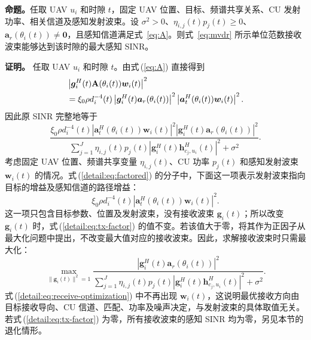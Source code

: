 \documentclass[11pt,a4paper]{ctexart}
\begin{document}
\noindent\textbf{命题。}任取 UAV $u_i$ 和时隙 $t$，固定 UAV 位置、目标、频谱共享关系、CU 发射功率、相关信道及感知发射波束。设 $\sigma^2>0$、$\eta_{i,j}(t)p_j(t)\ge0$、$\bm a_r(\theta_i(t))\ne\bm0$，且感知信道满足式~\eqref{eq:A}。则式~\eqref{eq:mvdr} 所示单位范数接收波束能够达到该时隙的最大感知 SINR。

\medskip
\noindent\textbf{证明。}
任取 UAV $u_i$ 和时隙 $t$。由式\,(\ref{eq:A}) 直接得到
\begin{align}
&\left|\bm g_i^H(t)\mathbf A(\theta_i(t))\bm w_i(t)\right|^2\notag\\
&=\xi_0\rho d_i^{-4}(t)
\left|\bm g_i^H(t)\bm a_r(\theta_i(t))\right|^2
\left|\bm a_t^H(\theta_i(t))\bm w_i(t)\right|^2.\label{detail:eq:factor}
\end{align}
因此原 SINR 完整地等于
\begin{equation}\label{detail:eq:factored}
\frac{\xi_0\rho d_i^{-4}(t)
\left|\bm a_t^H(\theta_i(t))\bm w_i(t)\right|^2
\left|\bm g_i^H(t)\bm a_r(\theta_i(t))\right|^2}
{\displaystyle\sum_{j=1}^J\eta_{i,j}(t)p_j(t)
\left|\bm g_i^H(t)\bm h_{c_j,u_i}^{H}(t)\right|^2+\sigma^2}.
\end{equation}
考虑固定 UAV 位置、频谱共享变量 $\eta_{i,j}(t)$、CU 功率 $p_j(t)$ 和感知发射波束 $\bm w_i(t)$ 的情况。式\,(\ref{detail:eq:factored}) 的分子中，下面这一项表示发射波束指向目标的增益及感知信道的路径增益：
\begin{equation}\label{detail:eq:tx-factor}
\xi_0\rho d_i^{-4}(t)
\left|\bm a_t^H(\theta_i(t))\bm w_i(t)\right|^2.
\end{equation}
这一项只包含目标参数、位置及发射波束，没有接收波束 $\bm g_i(t)$；所以改变 $\bm g_i(t)$ 时，式\,(\ref{detail:eq:tx-factor}) 的值不变。若该值大于零，将其作为正因子从最大化问题中提出，不改变最大值对应的接收波束。因此，求解接收波束时只需最大化：
\begin{equation}\label{detail:eq:receive-optimization}
\max_{\|\bm g_i(t)\|^2=1}
\frac{\left|\bm g_i^H(t)\bm a_r(\theta_i(t))\right|^2}
{\displaystyle\sum_{j=1}^J\eta_{i,j}(t)p_j(t)
\left|\bm g_i^H(t)\bm h_{c_j,u_i}^{H}(t)\right|^2+\sigma^2}.
\end{equation}
式\,(\ref{detail:eq:receive-optimization}) 中不再出现 $\bm w_i(t)$，这说明最优接收方向由目标接收导向、CU 信道、匹配、功率及噪声决定，与发射波束的具体取值无关。若式\,(\ref{detail:eq:tx-factor}) 为零，所有接收波束的感知 SINR 均为零，另见本节的退化情形。
\end{document}
